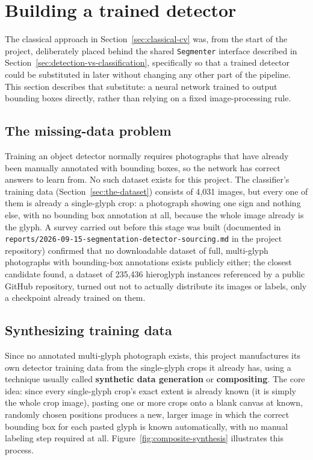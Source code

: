 \documentclass[11pt,a4paper]{report}
\begin{document}
\section{Building a trained detector}
\label{sec:trained-detector}

The classical approach in Section~\ref{sec:classical-cv} was, from the
start of the project, deliberately placed behind the shared
\texttt{Segmenter} interface described in Section~\ref{sec:detection-vs-classification},
specifically so that a trained detector could be substituted in later
without changing any other part of the pipeline. This section describes
that substitute: a neural network trained to output bounding boxes directly,
rather than relying on a fixed image-processing rule.

\subsection{The missing-data problem}
\label{sec:missing-data}

Training an object detector normally requires photographs that have already
been manually annotated with bounding boxes, so the network has correct
answers to learn from. No such dataset exists for this project. The
classifier's training data (Section~\ref{sec:the-dataset}) consists of
4{,}031 images, but every one of them is already a single-glyph crop: a
photograph showing one sign and nothing else, with no bounding box
annotation at all, because the whole image already is the glyph. A survey
carried out before this stage was built (documented in
\texttt{reports/2026-09-15-segmentation-detector-sourcing.md} in the project
repository) confirmed that no downloadable dataset of full, multi-glyph
photographs with bounding-box annotations exists publicly either; the
closest candidate found, a dataset of 235{,}436 hieroglyph instances
referenced by a public GitHub repository, turned out not to actually
distribute its images or labels, only a checkpoint already trained on them.

\subsection{Synthesizing training data}
\label{sec:composite-synthesis}

Since no annotated multi-glyph photograph exists, this project manufactures
its own detector training data from the single-glyph crops it already has,
using a technique usually called \textbf{synthetic data generation} or
\textbf{compositing}. The core idea: since every single-glyph crop's exact
extent is already known (it is simply the whole crop image), pasting one or
more crops onto a blank canvas at known, randomly chosen positions produces
a new, larger image in which the correct bounding box for each pasted glyph
is known automatically, with no manual labeling step required at all.
Figure~\ref{fig:composite-synthesis} illustrates this process.
\end{document}
